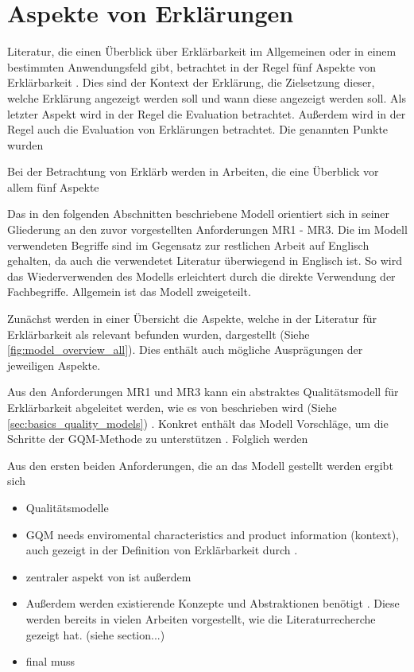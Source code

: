 \section{Aspekte von Erklärungen}
\label{sec:model_explanation_aspects}

Literatur, die einen Überblick über Erklärbarkeit im Allgemeinen oder in einem bestimmten Anwendungsfeld gibt, betrachtet in der Regel fünf Aspekte von Erklärbarkeit \cite{rosenfeld_explainability_2019, nunes_systematic_2017,chazette_knowledge_nodate}. Dies sind der Kontext der Erklärung, die Zielsetzung dieser, welche Erklärung angezeigt werden soll und wann diese angezeigt werden soll. Als letzter Aspekt wird in der Regel die Evaluation betrachtet. Außerdem wird in der Regel auch die Evaluation von Erklärungen betrachtet. Die genannten Punkte wurden 

Bei der Betrachtung von Erklärb werden in Arbeiten, die eine Überblick  vor allem fünf Aspekte 


Das in den folgenden Abschnitten beschriebene Modell orientiert sich in seiner Gliederung an den zuvor vorgestellten Anforderungen MR1 - MR3. Die im Modell verwendeten Begriffe sind im Gegensatz zur restlichen Arbeit auf Englisch gehalten, da auch die verwendetet Literatur überwiegend in Englisch ist. So wird das Wiederverwenden des Modells erleichtert durch die direkte Verwendung der Fachbegriffe. Allgemein ist das Modell zweigeteilt.

Zunächst werden in einer Übersicht die Aspekte, welche in der Literatur für Erklärbarkeit als relevant befunden wurden, dargestellt (Siehe \autoref{fig:model_overview_all}). Dies enthält auch mögliche Ausprägungen der jeweiligen Aspekte.

Aus den Anforderungen MR1 und MR3 kann ein abstraktes Qualitätsmodell für Erklärbarkeit abgeleitet werden, wie es von \citeauthor{schneider2012abenteuer} beschrieben wird (Siehe \autoref{sec:basics_quality_models}) \cite{schneider2012abenteuer}. Konkret enthält das Modell Vorschläge, um die Schritte der GQM-Methode zu unterstützen \cite{briand1995goal, schneider2012abenteuer}. Folglich werden 

Aus den ersten beiden Anforderungen, die an das Modell gestellt werden ergibt sich 

\begin{itemize}
    \item Qualitätsmodelle \cite{schneider2012abenteuer}
    \item GQM \cite{briand1995goal, schneider2012abenteuer} needs enviromental characteristics and product information (kontext), auch gezeigt in der Definition von Erklärbarkeit durch \cite{chazette_knowledge_nodate}.
    \item zentraler aspekt von \cite{briand1995goal} ist außerdem 
    \item Außerdem werden existierende Konzepte und Abstraktionen benötigt \cite{briand1995goal}. Diese werden bereits in vielen Arbeiten vorgestellt, wie die Literaturrecherche gezeigt hat. (siehe section...)
    \item final muss 
\end{itemize}

